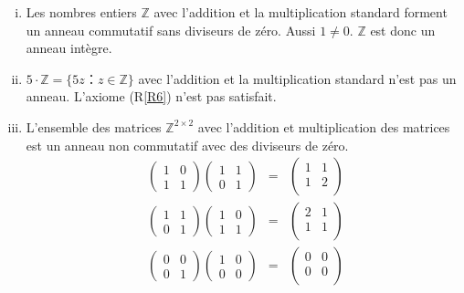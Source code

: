 \begin{example}
  \label{exe:32}
  \begin{enumerate}[i)]
  \item Les nombres entiers $ℤ$ avec l'addition et la multiplication standard forment un anneau commutatif sans diviseurs de zéro. Aussi $1 ≠ 0$. $ℤ$ est donc un anneau intègre. 
  \item $5 ⋅ℤ = \{ 5 z ：z ∈ ℤ\}$ avec l'addition et la multiplication standard n'est pas un anneau. L'axiome (R\ref{R6}) n'est pas satisfait.
  \item L'ensemble des matrices  $ℤ^{2 ×2}$ avec l'addition et multiplication des matrices est un anneau non commutatif avec des diviseurs de zéro. 
    \begin{eqnarray*}
      \begin{pmatrix}
        1 & 0 \\
        1 & 1 
      \end{pmatrix}
       \begin{pmatrix}
        1 & 1 \\
         0& 1 
       \end{pmatrix}   & = &
                            \begin{pmatrix}
                               1 & 1 \\
                               1 & 2 \\
                             \end{pmatrix}  \\      
      \begin{pmatrix}
        1 & 1 \\
        0 & 1 
      \end{pmatrix}
       \begin{pmatrix}
        1 & 0 \\
         1 & 1 
       \end{pmatrix}   & = &
                            \begin{pmatrix}
                               2 & 1 \\
                               1 & 1 \\
                             \end{pmatrix}       
    \end{eqnarray*}
     \begin{eqnarray*}
      \begin{pmatrix}
        0 & 0 \\
        0 & 1 
      \end{pmatrix}
       \begin{pmatrix}
        1 & 0 \\
         0& 0 
       \end{pmatrix}   & = &
                            \begin{pmatrix}
                               0 & 0 \\
                               0 & 0 \\
                             \end{pmatrix}  
     \end{eqnarray*}
   \end{enumerate}
\end{example}


